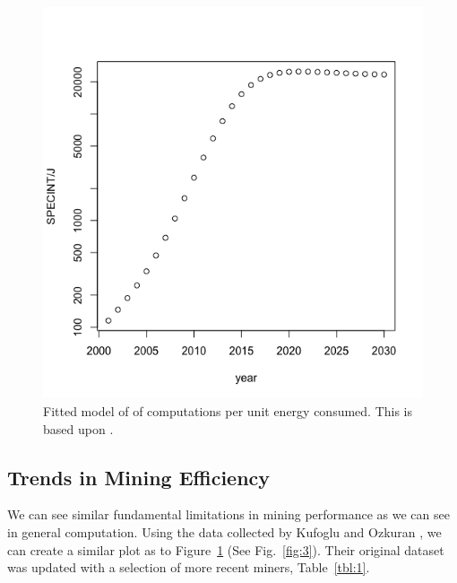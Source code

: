 \documentclass[runningheads]{llncs}
\begin{document}
\begin{figure}
    \includegraphics[width=\textwidth]{Processor Forecast.png}
    \caption{Fitted model of of computations per unit energy consumed. This is based upon \cite{rupp2020trends}.} \label{fig:2}
\end{figure}

\subsection{Trends in Mining Efficiency}

We can see similar fundamental limitations in mining performance as we can see in general computation.
Using the data collected by Kufoglu and Ozkuran \cite{kuf2019mining}, we can create a similar plot as to Figure~\ref{fig:2} (See Fig.~\ref{fig:3}).
Their original dataset was updated with a selection of more recent miners, Table~\ref{tbl:1}.
\end{document}
